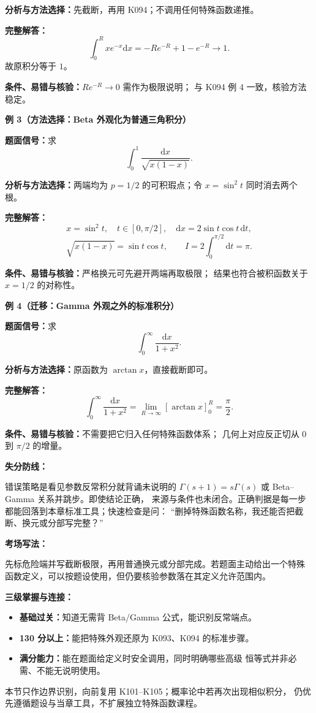 \begin{knowledgeBox}
\textbf{分析与方法选择：}先截断，再用 K094；不调用任何特殊函数递推。

\textbf{完整解答：}
\[
\int_0^Rxe^{-x}\mathrm dx
=-Re^{-R}+1-e^{-R}\to1.
\]
故原积分等于 \(1\)。

\textbf{条件、易错与核验：}\(Re^{-R}\to0\) 需作为极限说明；
与 K094 例 4 一致，核验方法稳定。

\textbf{例 3（方法选择：Beta 外观化为普通三角积分）}

\textbf{题面信号：}求
\[
\int_0^1\frac{\mathrm dx}{\sqrt{x(1-x)}}.
\]

\textbf{分析与方法选择：}两端均为 \(p=1/2\) 的可积瑕点；令
\(x=\sin^2t\) 同时消去两个根。

\textbf{完整解答：}
\[
x=\sin^2t,\quad t\in[0,\pi/2],\quad
\mathrm dx=2\sin t\cos t\,\mathrm dt,
\]
\[
\sqrt{x(1-x)}=\sin t\cos t,
\qquad
I=2\int_0^{\pi/2}\mathrm dt=\pi.
\]

\textbf{条件、易错与核验：}严格换元可先避开两端再取极限；
结果也符合被积函数关于 \(x=1/2\) 的对称性。

\textbf{例 4（迁移：Gamma 外观之外的标准积分）}

\textbf{题面信号：}求
\[
\int_0^\infty\frac{\mathrm dx}{1+x^2}.
\]

\textbf{分析与方法选择：}原函数为 \(\arctan x\)，直接截断即可。

\textbf{完整解答：}
\[
\int_0^\infty\frac{\mathrm dx}{1+x^2}
=\lim_{R\to\infty}[\arctan x]_0^R=\frac\pi2.
\]

\textbf{条件、易错与核验：}不需要把它归入任何特殊函数体系；
几何上对应反正切从 \(0\) 到 \(\pi/2\) 的增量。

\textbf{失分防线：}

错误策略是看见参数反常积分就背诵未说明的
\(\Gamma(s+1)=s\Gamma(s)\) 或 Beta--Gamma 关系并跳步。即使结论正确，
来源与条件也未闭合。正确判据是每一步都能回落到本章标准工具；快速检查是问：
“删掉特殊函数名称，我还能否把截断、换元或分部写完整？”

\textbf{考场写法：}

先标危险端并写截断极限，再用普通换元或分部完成。若题面主动给出一个特殊
函数定义，可以按题设使用，但仍要核验参数落在其定义允许范围内。

\textbf{三级掌握与连接：}
\begin{itemize}
  \item \textbf{基础过关：}知道无需背 Beta/Gamma 公式，能识别反常端点。
  \item \textbf{130 分以上：}能把特殊外观还原为 K093、K094 的标准步骤。
  \item \textbf{满分能力：}能在题面给定义时安全调用，同时明确哪些高级
  恒等式并非必需、不能无说明使用。
\end{itemize}
本节只作边界识别，向前复用 K101--K105；概率论中若再次出现相似积分，
仍优先遵循题设与当章工具，不扩展独立特殊函数课程。
\end{knowledgeBox}
